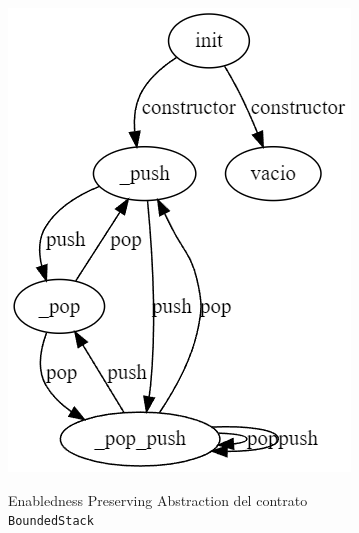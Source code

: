 \begin{figure}
    \centering
    \begin{subfigure}{0.45\textwidth}
        {\includegraphics[width=\textwidth]{figs/bounded-stack-good-epa.png}}
        \caption{Enabledness Preserving Abstraction del contrato \texttt{BoundedStack}}
        \label{fig:bounded-stack-epa}
    \end{subfigure}
    \hfill
    \begin{subfigure}{0.45\textwidth}

\end{subfigure}
\end{figure}
